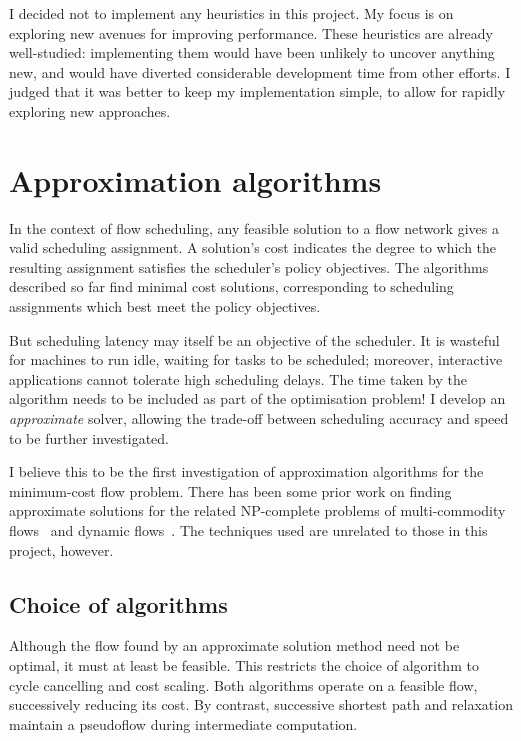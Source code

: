 I decided not to implement any heuristics in this project. My focus is on exploring new avenues for improving performance. These heuristics are already well-studied: implementing them would have been unlikely to uncover anything new, and would have diverted considerable development time from other efforts. I judged that it was better to keep my implementation simple, to allow for rapidly exploring new approaches.


\section{Approximation algorithms} \label{sec:impl-approx}

In the context of flow scheduling, any feasible solution to a flow network gives a valid scheduling assignment. A solution's cost indicates the degree to which the resulting assignment satisfies the scheduler's policy objectives. The algorithms described so far find minimal cost solutions, corresponding to scheduling assignments which best meet the policy objectives.

But scheduling latency may itself be an objective of the scheduler. It is wasteful for machines to run idle, waiting for tasks to be scheduled; moreover, interactive applications cannot tolerate high scheduling delays. The time taken by the algorithm needs to be included as part of the optimisation problem! I develop an \emph{approximate} solver, allowing the trade-off between scheduling accuracy and speed to be further investigated.

I believe this to be the first investigation of approximation algorithms for the minimum-cost flow problem. There has been some prior work on finding approximate solutions for the related NP-complete problems of multi-commodity flows~\cite{Garg:2007} and dynamic flows~\cite{Hoppe:1994}. The techniques used are unrelated to those in this project, however.

\subsection{Choice of algorithms} \label{sec:impl-approx-choice}

Although the flow found by an approximate solution method need not be optimal, it must at least be feasible. This restricts the choice of algorithm to cycle cancelling and cost scaling. Both algorithms operate on a feasible flow, successively reducing its cost. By contrast, successive shortest path and relaxation maintain a pseudoflow during intermediate computation.

